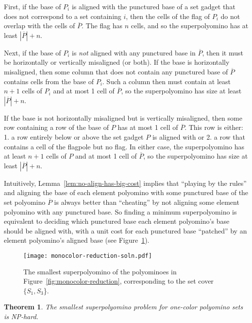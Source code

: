 \documentclass{article}
\newtheorem{theorem}{Theorem}[section]
\newenvironment{proof}[1][Proof]{\begin{trivlist}
\item[\hskip \labelsep {\bfseries #1}]}{\end{trivlist}}
\newcommand{\ccNP}{\textrm{\textsc{NP}}}
\begin{document}
\begin{proof}
First, if the base of $P_i$ is aligned with the punctured base of a set gadget that does not correspond to a set containing $i$, then the cells of the flag of $P_i$ do not overlap with the cells of $\overline{P}$.
The flag has $n$ cells, and so the superpolyomino has at least $|\overline{P}| + n$.

Next, if the base of $P_i$ is \emph{not} aligned with any punctured base in $\overline{P}$, then it must be horizontally or vertically misaligned (or both).
If the base is horizontally misaligned, then some column that does not contain any punctured base of $\overline{P}$ contains cells from the base of $P_i$.
Such a column then must contain at least $n+1$ cells of $P_i$ and at most 1 cell of $\overline{P}$, so the superpolyomino has size at least $|\overline{P}| + n$.

If the base is not horizontally misaligned but is vertically misaligned, then some row containing a row of the base of $P$ has at most 1 cell of $\overline{P}$.
This row is either: 1. a row entirely below or above the set gadget $P$ is aligned with or 2. a row that contains a cell of the flagpole but no flag. 
In either case, the superpolyomino has at least $n+1$ cells of $P$ and at most 1 cell of $\overline{P}$, so the superpolyomino has size at least $|\overline{P}| + n$.
\end{proof}

Intuitively, Lemma~\ref{lem:no-align-has-big-cost} implies that ``playing by the rules'' and aligning the base of each element polyomino with some punctured base of the set polyomino $\overline{P}$ is always better than ``cheating'' by not aligning some element polyomino with any punctured base.
So finding a minimum superpolyomino is equivalent to deciding which punctured base each element polyomino's base should be aligned with, with a unit cost for each punctured base ``patched'' by an element polyomino's aligned base (see Figure~\ref{fig:monocolor-reduction-soln}).

\begin{figure}[ht]
\centering
\texttt{[image: monocolor-reduction-soln.pdf]}
\caption{The smallest superpolyomino of the polyominoes in Figure~\ref{fig:monocolor-reduction}, corresponding to the set cover $\{S_1, S_3$\}.}
\label{fig:monocolor-reduction-soln}
\end{figure}

\begin{theorem}
The smallest superpolyomino problem for one-color polyomino sets is \ccNP-hard.
\end{theorem}
\end{document}

